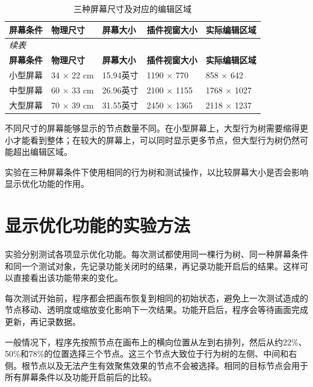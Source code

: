 \documentclass[11pt,a4paper,oneside,extrafontsizes]{memoir}
\begin{document}
\begin{center}
\small
\begin{longtable}{@{}p{} p{} p{} p{} p{}@{}}
\caption{三种屏幕尺寸及对应的编辑区域}\label{tab:auto-2}\\
\toprule
\textbf{屏幕条件} & \textbf{物理尺寸} & \textbf{屏幕大小} & \textbf{插件视窗大小} & \textbf{实际编辑区域} \\
\midrule
\endfirsthead
\multicolumn{5}{l}{\small\itshape 续表}\\
\toprule
\textbf{屏幕条件} & \textbf{物理尺寸} & \textbf{屏幕大小} & \textbf{插件视窗大小} & \textbf{实际编辑区域} \\
\midrule
\endhead
小型屏幕 & 34 × 22 cm & 15.94英寸 & 1190 × 770 & 858 × 642 \\
中型屏幕 & 60 × 33 cm & 26.96英寸 & 2100 × 1155 & 1768 × 1027 \\
大型屏幕 & 70 × 39 cm & 31.55英寸 & 2450 × 1365 & 2118 × 1237 \\
\bottomrule
\end{longtable}
\end{center}

不同尺寸的屏幕能够显示的节点数量不同。在小型屏幕上，大型行为树需要缩得更小才能看到整体；在较大的屏幕上，可以同时显示更多节点，但大型行为树仍然可能超出编辑区域。

实验在三种屏幕条件下使用相同的行为树和测试操作，以比较屏幕大小是否会影响显示优化功能的作用。

\section{显示优化功能的实验方法}

实验分别测试各项显示优化功能。每次测试都使用同一棵行为树、同一种屏幕条件和同一个测试对象，先记录功能关闭时的结果，再记录功能开启后的结果。这样可以直接看出该功能带来的变化。

每次测试开始前，程序都会把画布恢复到相同的初始状态，避免上一次测试造成的节点移动、透明度或缩放变化影响下一次结果。功能开启后，程序会等待画面完成更新，再记录数据。

一般情况下，程序先按照节点在画布上的横向位置从左到右排列，然后从约22\%、50\%和78\%的位置选择三个节点。这三个节点大致位于行为树的左侧、中间和右侧。根节点以及无法产生有效聚焦效果的节点不会被选择。相同的目标节点会用于所有屏幕条件以及功能开启前后的比较。
\end{document}

